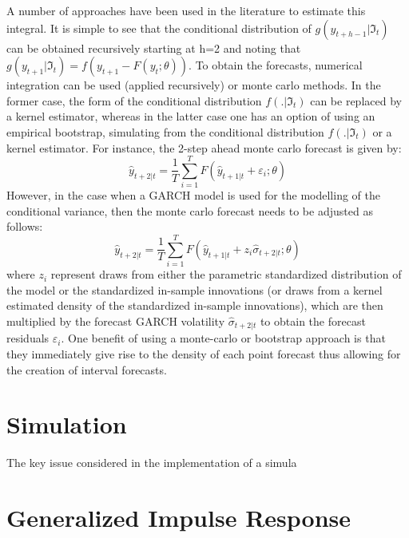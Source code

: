 A number of approaches have been used in the literature to estimate this
integral. It is simple to see that the conditional distribution of ${g\left(
{{y_{t + h - 1}}\left| {{\Im _t}} \right.} \right)}$ can be obtained recursively
starting at h=2 and noting that $g\left( {{y_{t + 1}}\left| {{\Im _t}} \right.}
\right) = f\left( {{y_{t + 1}} - F\left( {{y_t};\theta } \right)} \right)$. To
obtain the forecasts, numerical integration can be used (applied recursively) or
monte carlo methods. In the former case, the form of the conditional
distribution $f\left( {.\left| {{\Im _t}} \right.} \right)$ can be replaced by a
kernel estimator, whereas in the latter case one has an option of using an
empirical bootstrap, simulating from the conditional distribution $f\left(
{.\left| {{\Im _t}} \right.} \right)$ or a kernel estimator.  For instance,  
the 2-step ahead monte carlo forecast is given by:
\begin{equation}
{{\hat y}_{t + 2\left| t \right.}} = \frac{1}{T}\sum\limits_{i = 1}^T {F\left( {{{\hat y}_{t + 1\left| t \right.}} + {\varepsilon _i};\theta } \right)}
\end{equation}
However, in the case when a GARCH model is used for the modelling of the
conditional variance, then the monte carlo forecast needs to be adjusted as follows:
\begin{equation}
{{\hat y}_{t + 2\left| t \right.}} = \frac{1}{T}\sum\limits_{i = 1}^T {F\left( {{{\hat y}_{t + 1\left| t \right.}} + {z_i}{{\hat \sigma }_{t + 2\left| t \right.}};\theta } \right)}
\end{equation}
where $z_i$ represent draws from either the parametric standardized distribution
of the model  or the standardized in-sample innovations (or draws from a kernel
estimated density of the standardized in-sample innovations), which are then
multiplied  by the forecast GARCH volatility ${{{\hat \sigma }_{t + 2\left| t
\right.}}}$ to obtain the forecast residuals $\varepsilon_i$.
One benefit of using a monte-carlo or bootstrap approach is that they
immediately give rise to the density of each point forecast thus allowing for
the creation of interval forecasts.

\section{Simulation}\label{sec:3}
The key issue considered in the implementation of a simula

\section{Generalized Impulse Response}\label{sec:4}

